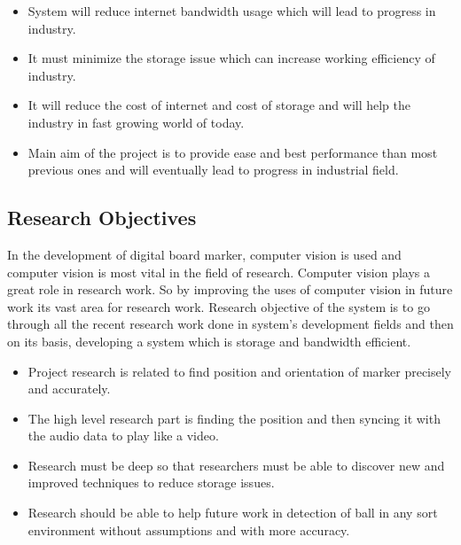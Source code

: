\begin{itemize}

\item System will reduce internet bandwidth usage which 
will lead to progress in industry.
\item It must minimize the storage issue which can increase working efficiency of industry.
\item It will reduce the cost of internet and cost of storage and will help the industry in fast growing world of today.
\item Main aim of the project is to provide ease and best performance than most previous ones and will eventually lead to progress in industrial field.

\end{itemize}

\bigskip

\subsection{Research Objectives}
In the development of digital board marker, computer vision is used and computer vision is most vital in the field of research. Computer vision plays a great role in research work. So by improving the uses of computer vision in future work its vast area for research work.
Research objective of the system is to go through all the recent research work done in system's development fields and then on its basis, developing a system which is storage and bandwidth efficient.

\begin{itemize}

\item Project research is related to find position and orientation of marker precisely and accurately.
\item The high level research part is finding the position and then syncing it with the audio data to play like a video.
\item Research must be deep so that researchers must be able to discover new and improved techniques to reduce storage issues.
\item Research should be able to help future work in detection of ball in any sort environment without assumptions and with more accuracy.

\end{itemize}

\bigskip

